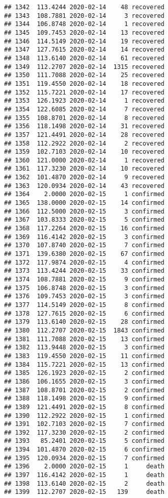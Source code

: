 \documentclass[
]{article}
\begin{document}
\begin{verbatim}
## 1342  113.4244 2020-02-14    48 recovered
## 1343  108.7881 2020-02-14     3 recovered
## 1344  106.8748 2020-02-14     1 recovered
## 1345  109.7453 2020-02-14    13 recovered
## 1346  114.5149 2020-02-14    19 recovered
## 1347  127.7615 2020-02-14    14 recovered
## 1348  113.6140 2020-02-14    61 recovered
## 1349  112.2707 2020-02-14  1315 recovered
## 1350  111.7088 2020-02-14    25 recovered
## 1351  119.4550 2020-02-14    18 recovered
## 1352  115.7221 2020-02-14    17 recovered
## 1353  126.1923 2020-02-14     1 recovered
## 1354  122.6085 2020-02-14     7 recovered
## 1355  108.8701 2020-02-14     8 recovered
## 1356  118.1498 2020-02-14    31 recovered
## 1357  121.4491 2020-02-14    28 recovered
## 1358  112.2922 2020-02-14     2 recovered
## 1359  102.7103 2020-02-14    10 recovered
## 1360  121.0000 2020-02-14     1 recovered
## 1361  117.3230 2020-02-14    10 recovered
## 1362  101.4870 2020-02-14     9 recovered
## 1363  120.0934 2020-02-14    43 recovered
## 1364    2.0000 2020-02-15     1 confirmed
## 1365  138.0000 2020-02-15    14 confirmed
## 1366  112.5000 2020-02-15     3 confirmed
## 1367  103.8333 2020-02-15     5 confirmed
## 1368  117.2264 2020-02-15    16 confirmed
## 1369  116.4142 2020-02-15     3 confirmed
## 1370  107.8740 2020-02-15     7 confirmed
## 1371  139.6380 2020-02-15    67 confirmed
## 1372  117.9874 2020-02-15     4 confirmed
## 1373  113.4244 2020-02-15    33 confirmed
## 1374  108.7881 2020-02-15     9 confirmed
## 1375  106.8748 2020-02-15     3 confirmed
## 1376  109.7453 2020-02-15     3 confirmed
## 1377  114.5149 2020-02-15     8 confirmed
## 1378  127.7615 2020-02-15     6 confirmed
## 1379  113.6140 2020-02-15    28 confirmed
## 1380  112.2707 2020-02-15  1843 confirmed
## 1381  111.7088 2020-02-15    13 confirmed
## 1382  113.9448 2020-02-15     3 confirmed
## 1383  119.4550 2020-02-15    11 confirmed
## 1384  115.7221 2020-02-15    13 confirmed
## 1385  126.1923 2020-02-15     2 confirmed
## 1386  106.1655 2020-02-15     3 confirmed
## 1387  108.8701 2020-02-15     2 confirmed
## 1388  118.1498 2020-02-15     9 confirmed
## 1389  121.4491 2020-02-15     8 confirmed
## 1390  112.2922 2020-02-15     1 confirmed
## 1391  102.7103 2020-02-15     7 confirmed
## 1392  117.3230 2020-02-15     2 confirmed
## 1393   85.2401 2020-02-15     5 confirmed
## 1394  101.4870 2020-02-15     6 confirmed
## 1395  120.0934 2020-02-15     7 confirmed
## 1396    2.0000 2020-02-15     1     death
## 1397  116.4142 2020-02-15     1     death
## 1398  113.6140 2020-02-15     2     death
## 1399  112.2707 2020-02-15   139     death

\end{verbatim}
\end{document}
